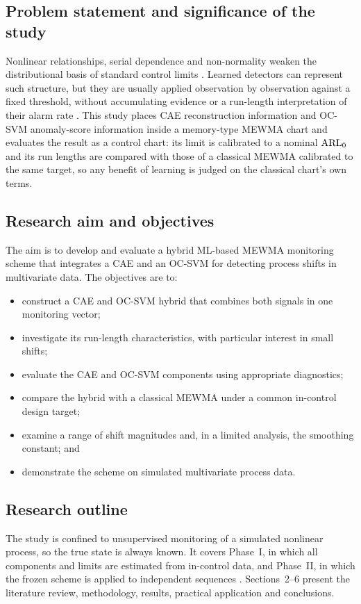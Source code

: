 \subsection{Problem statement and significance of the study}

Nonlinear relationships, serial dependence and non-normality weaken the distributional basis of
standard control limits \citep{lowry_multivariate_1992,ahmed_statistical_2017}. Learned detectors
can represent such structure, but they are usually applied observation by observation against a
fixed threshold, without accumulating evidence or a run-length interpretation of their alarm rate
\citep{mabu_disaster_2019,biegel_deep_2022,guzman_sidewalk_2026}. This study places CAE
reconstruction information and OC-SVM anomaly-score information inside a memory-type MEWMA chart
and evaluates the result as a control chart: its limit is calibrated to a nominal $\mathrm{ARL}_0$ and its
run lengths are compared with those of a classical MEWMA calibrated to the same target, so any
benefit of learning is judged on the classical chart's own terms.

\subsection{Research aim and objectives}

The aim is to develop and evaluate a hybrid ML-based MEWMA monitoring scheme that integrates a CAE and
an OC-SVM for detecting process shifts in multivariate data. The objectives are to:
\begin{itemize}
\item construct a CAE and OC-SVM hybrid that combines both signals in one monitoring vector;
\item investigate its run-length characteristics, with particular interest in small shifts;
\item evaluate the CAE and OC-SVM components using appropriate diagnostics;
\item compare the hybrid with a classical MEWMA under a common in-control design target;
\item examine a range of shift magnitudes and, in a limited analysis, the smoothing constant; and
\item demonstrate the scheme on simulated multivariate process data.
\end{itemize}

\subsection{Research outline}

The study is confined to unsupervised monitoring of a simulated nonlinear process, so the true state
is always known. It covers Phase~I, in which all components and limits are estimated from in-control
data, and Phase~II, in which the frozen scheme is applied to independent sequences
\citep{ahmed_statistical_2017}. Sections~2--6 present the literature review, methodology, results,
practical application and conclusions.
